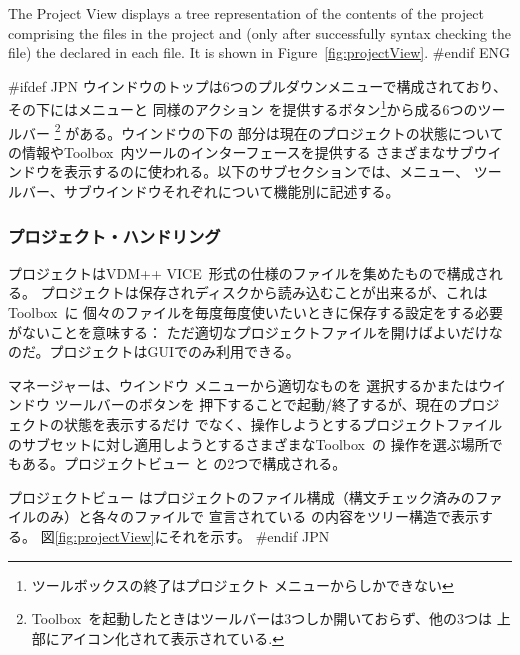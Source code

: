 \documentclass[\pformat,12pt]{article}
\newcommand{\vdmslpp}{VDM-SL}
\newcommand{\Toolbox}{Toolbox}
\newcommand{\vdmslpp}{VDM++}
\newcommand{\Toolbox}{Toolbox}
\renewcommand{\vdmslpp}{VDM++ VICE}
\newcommand{\guicmd}[1]{{\sf #1}}
\newcommand{\guicmd}[1]{{\gt #1}}
\begin{document}
The \guicmd{Project View} displays a tree representation of the contents
of the project comprising the files in the project and (only after
successfully syntax checking the file) the
 declared in each file. 
It is shown in Figure~\ref{fig:projectView}.
#endif ENG

#ifdef JPN
ウインドウのトップは6つのプルダウンメニューで構成されており、その下にはメニューと
同様のアクション を提供するボタン\footnote{ツールボックスの終了は\guicmd{プロジェクト} 
メニューからしかできない}から成る6つのツールバー
\footnote{\Toolbox\ を起動したときはツールバーは3つしか開いておらず、他の3つは
上部にアイコン化されて表示されている.} 
がある。ウインドウの下の
部分は現在のプロジェクトの状態についての情報や\Toolbox\ 内ツールのインターフェースを提供する
さまざまなサブウインドウを表示するのに使われる。以下のサブセクションでは、メニュー、
ツールバー、サブウインドウそれぞれについて機能別に記述する。

\subsubsection{プロジェクト・ハンドリング}
プロジェクトは\vdmslpp\ 形式の仕様のファイルを集めたもので構成される。
プロジェクトは保存されディスクから読み込むことが出来るが、これは\Toolbox\ に
個々のファイルを毎度毎度使いたいときに保存する設定をする必要がないことを意味する：
ただ適切なプロジェクトファイルを開けばよいだけなのだ。プロジェクトはGUIでのみ利用できる。

\guicmd{マネージャー}は、\guicmd{ウインドウ} メニューから適切なものを
選択するかまたは\guicmd{ウインドウ} 
ツールバーのボタンを
押下することで起動/終了するが、現在のプロジェクトの状態を表示するだけ
でなく、操作しようとするプロジェクトファイルのサブセットに対し適用しようとするさまざまな\Toolbox\ の
操作を選ぶ場所でもある。\guicmd{プロジェクトビュー} と
\ifthenelse{\boolean{VDMsl}}{\guicmd{モジュールビュー}}{\guicmd{クラスビュー}}
の2つで構成される。

\guicmd{プロジェクトビュー} はプロジェクトのファイル構成（構文チェック済みのファイルのみ）と各々のファイルで
宣言されている
 の内容をツリー構造で表示する。
図\ref{fig:projectView}にそれを示す。
#endif JPN
\end{document}

